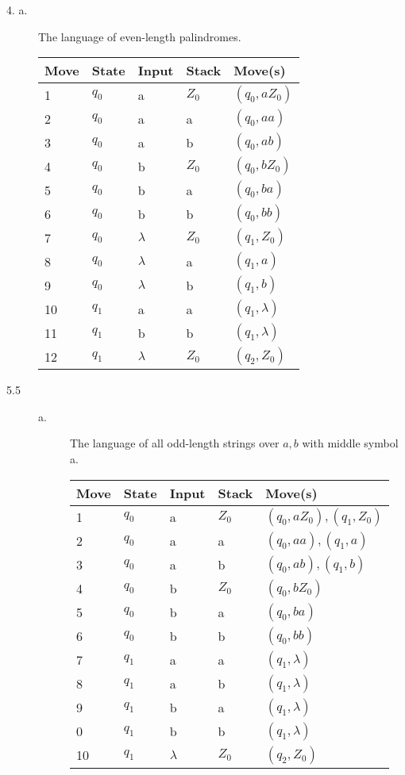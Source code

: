 \documentclass{article}
\begin{document}
\begin{description}
\item[4. a.]
  The language of even-length palindromes.\\
  \begin{center}
    \begin{tabular}{|lllll|}
      \hline
      Move & State & Input & Stack & Move(s)\\
      \hline
      1 & $q_0$ & a & $Z_0$ & $(q_0, aZ_0)$\\
      2 & $q_0$ & a & a & $(q_0, aa)$\\
      3 & $q_0$ & a & b & $(q_0, ab)$\\
      4 & $q_0$ & b & $Z_0$ & $(q_0, bZ_0)$\\
      5 & $q_0$ & b & a & $(q_0, ba)$\\
      6 & $q_0$ & b & b & $(q_0, bb)$\\
      7 & $q_0$ & $\lambda$ & $Z_0$ & $(q_1, Z_0)$\\
      8 & $q_0$ & $\lambda$ & a & $(q_1, a)$\\
      9 & $q_0$ & $\lambda$ & b & $(q_1, b)$\\
      10 & $q_1$ & a & a & $(q_1, \lambda)$\\
      11 & $q_1$ & b & b & $(q_1, \lambda)$\\
      12 & $q_1$ & $\lambda$ & $Z_0$ & $(q_2, Z_0)$\\
      \hline
    \end{tabular}
  \end{center}

\item[5.5]
  \begin{description}
  \item[a.]
    The language of all odd-length strings over ${a, b}$ with middle symbol a.
    \begin{center}
      \begin{tabular}{|lllll|}
        \hline
        Move & State & Input & Stack & Move(s)\\
        \hline
        1 & $q_0$ & a & $Z_0$ & $(q_0,aZ_0),(q_1,Z_0)$\\
        2 & $q_0$ & a & a & $(q_0,aa),(q_1,a)$\\
        3 & $q_0$ & a & b & $(q_0,ab),(q_1,b)$\\
        4 & $q_0$ & b & $Z_0$ & $(q_0,bZ_0)$\\
        5 & $q_0$ & b & a & $(q_0,ba)$\\
        6 & $q_0$ & b & b & $(q_0,bb)$\\
        7 & $q_1$ & a & a & $(q_1,\lambda)$\\
        8 & $q_1$ & a & b & $(q_1,\lambda)$\\
        9 & $q_1$ & b & a & $(q_1,\lambda)$\\
        0 & $q_1$ & b & b & $(q_1,\lambda)$\\
        10 & $q_1$ & $\lambda$ & $Z_0$ & $(q_2,Z_0)$\\
        \hline
      \end{tabular}
    \end{center}
    

\end{description}
\end{description}
\end{document}
